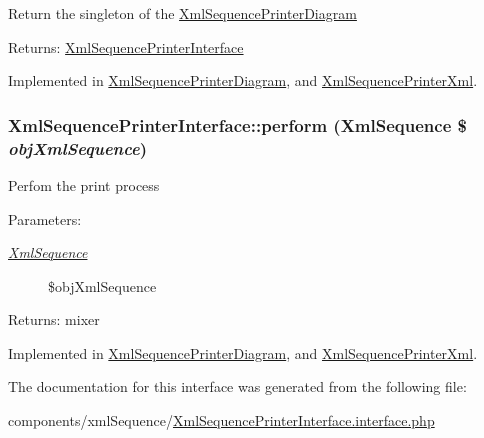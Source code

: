 Return the singleton of the \hyperlink{class_xml_sequence_printer_diagram}{XmlSequencePrinterDiagram}

\begin{Desc}
\item[Returns:]\hyperlink{interface_xml_sequence_printer_interface}{XmlSequencePrinterInterface} \end{Desc}


Implemented in \hyperlink{class_xml_sequence_printer_diagram_c11a145d18a480a3fa4d8404f9aa1649}{XmlSequencePrinterDiagram}, and \hyperlink{class_xml_sequence_printer_xml_1c628de89547bd7a6aa509748e562e67}{XmlSequencePrinterXml}.\hypertarget{interface_xml_sequence_printer_interface_68a8066e69c402d49dd0a16a22cfcb6b}{
\subsubsection[{perform}]{\setlength{\rightskip}{0pt plus 5cm}XmlSequencePrinterInterface::perform ({\bf XmlSequence} \$ {\em objXmlSequence})}}
\label{interface_xml_sequence_printer_interface_68a8066e69c402d49dd0a16a22cfcb6b}


Perfom the print process

\begin{Desc}
\item[Parameters:]
\begin{description}
\item[{\em \hyperlink{class_xml_sequence}{XmlSequence}}]\$objXmlSequence \end{description}
\end{Desc}
\begin{Desc}
\item[Returns:]mixer \end{Desc}


Implemented in \hyperlink{class_xml_sequence_printer_diagram_a94b897abb072d1d895c2e63dfa066d2}{XmlSequencePrinterDiagram}, and \hyperlink{class_xml_sequence_printer_xml_7e88c479f35acfc1ce0f053c4dbadb1b}{XmlSequencePrinterXml}.

The documentation for this interface was generated from the following file:\begin{CompactItemize}
\item 
components/xmlSequence/\hyperlink{_xml_sequence_printer_interface_8interface_8php}{XmlSequencePrinterInterface.interface.php}\end{CompactItemize}
